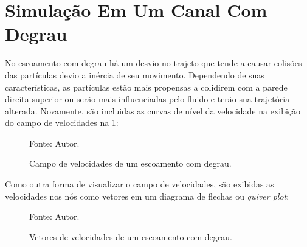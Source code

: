 \section{\textbf{Simulação Em Um Canal Com Degrau}}
\label{sec_step}
No escoamento com degrau há um desvio no trajeto que tende a causar colisões das partículas devio a inércia de seu movimento.
Dependendo de suas características, as partículas estão mais propensas a colidirem com a parede direita superior ou serão mais influenciadas pelo fluido e terão sua trajetória alterada.
Novamente, são incluidas as curvas de nível da velocidade na exibição do campo de velocidades na \ref{step_result}:
\begin{figure}[H]
    \centering
     {\raggedleft \scriptsize Fonte: Autor.}
    \caption{Campo de velocidades de um escoamento com degrau.}
    \label{step_result}
\end{figure}

Como outra forma de visualizar o campo de velocidades, são exibidas as velocidades nos nós como vetores em um diagrama de flechas ou \textit{quiver plot}:
\begin{figure}[H]
    \centering
     {\raggedleft \scriptsize Fonte: Autor.}
    \caption{Vetores de velocidades de um escoamento com degrau.}
    \label{step_velocity}
\end{figure}


